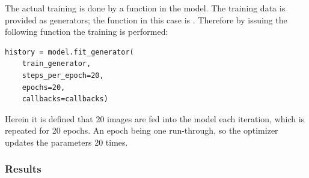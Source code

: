 The actual training is done by a  function in the model.
The training data is provided as generators; the function in this case is .
Therefore by issuing the following function the training is performed:
\begin{lstlisting}
history = model.fit_generator(
    train_generator,
    steps_per_epoch=20,
    epochs=20,
    callbacks=callbacks)
\end{lstlisting}

Herein it is defined that 20 images are fed into the model each iteration, which is repeated for 20 epochs.
An epoch being one run-through, so the optimizer updates the parameters 20 times.

\subsubsection{Results}
